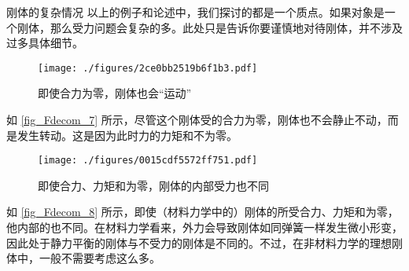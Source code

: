 \begin{example}{刚体的复杂情况}
以上的例子和论述中，我们探讨的都是一个质点。如果对象是一个刚体，那么受力问题会复杂的多。此处只是告诉你要谨慎地对待刚体，并不涉及过多具体细节。

\begin{figure}[ht]
\centering
\texttt{[image: ./figures/2ce0bb2519b6f1b3.pdf]}
\caption{即使合力为零，刚体也会“运动”} \label{fig_Fdecom_7}
\end{figure}
如 \autoref{fig_Fdecom_7} 所示，尽管这个刚体受的合力为零，刚体也不会静止不动，而是发生转动。这是因为此时力的力矩和不为零。

\begin{figure}[ht]
\centering
\texttt{[image: ./figures/0015cdf5572ff751.pdf]}
\caption{即使合力、力矩和为零，刚体的内部受力也不同} \label{fig_Fdecom_8}
\end{figure}
如 \autoref{fig_Fdecom_8}  所示，即使（材料力学中的）刚体的所受合力、力矩和为零，他内部的也不同。在材料力学看来，外力会导致刚体如同弹簧一样发生微小形变，因此处于静力平衡的刚体与不受力的刚体是不同的。不过，在非材料力学的理想刚体中，一般不需要考虑这么多。
\end{example}
